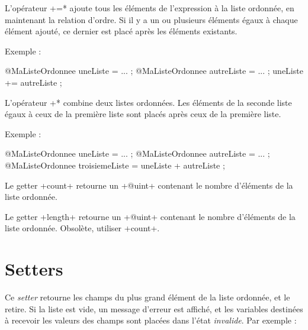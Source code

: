 
L'opérateur \ggst*+=* ajoute tous les éléments de l'expression à la liste ordonnée, en maintenant la relation d'ordre. Si il y a un ou plusieurs éléments égaux à chaque élément ajouté, ce dernier est placé après les éléments existants.

Exemple :
\begin{galgas3}
@MaListeOrdonnee uneListe = ... ;
@MaListeOrdonnee autreListe = ... ;
uneListe += autreListe ;
\end{galgas3}


L'opérateur \ggst*+* combine deux listes ordonnées. Les éléments de la seconde liste égaux à ceux de la première liste sont placés après ceux de la première liste.

Exemple :
\begin{galgas3}
@MaListeOrdonnee uneListe = ... ;
@MaListeOrdonnee autreListe = ... ;
@MaListeOrdonnee troisiemeListe = uneListe + autreListe ;
\end{galgas3}








Le getter \ggst+count+ retourne un \ggst+@uint+ contenant le nombre d'éléments de la liste ordonnée.









Le getter \ggst+length+ retourne un \ggst+@uint+ contenant le nombre d'éléments de la liste ordonnée. Obsolète, utiliser \ggst+count+.






\section{Setters}


Ce \emph{setter} retourne les champs du plus grand élément de la liste ordonnée, et le retire. Si la liste est vide, un message d'erreur est affiché, et les variables destinées à recevoir les valeurs des champs sont placées dans l'état \emph{invalide}. Par exemple :

